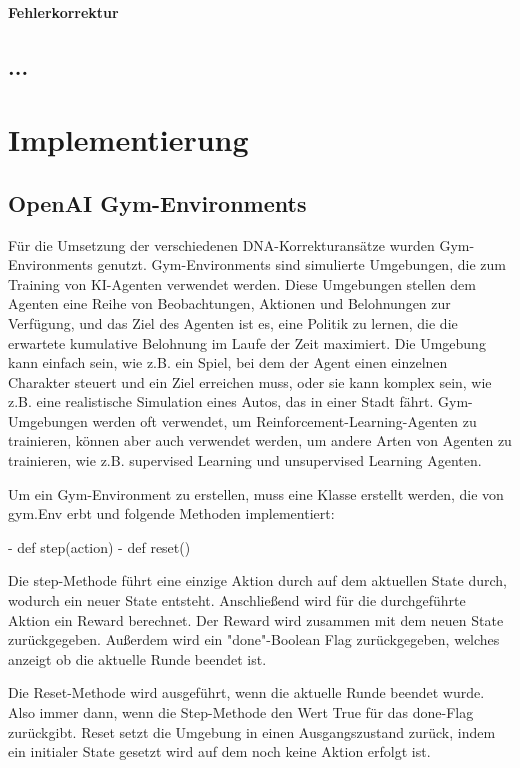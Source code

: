 \documentclass[oneside,bibliography=totocnumbered,BCOR=5mm]{scrbook}%
\theoremstyle{definition}
\theoremstyle{definition}
\theoremstyle{definition}
\theoremstyle{definition}
\theoremstyle{definition}
\theoremstyle{definition}
\begin{document}
\subsubsection{Fehlerkorrektur}
\section{...}


\clearpage


\chapter{Implementierung}

\section{OpenAI Gym-Environments}

Für die Umsetzung der verschiedenen DNA-Korrekturansätze wurden Gym-Environments genutzt.
Gym-Environments sind simulierte Umgebungen, die zum Training von KI-Agenten verwendet werden. 
Diese Umgebungen stellen dem Agenten eine Reihe von Beobachtungen, Aktionen und Belohnungen zur Verfügung, 
und das Ziel des Agenten ist es, eine Politik zu lernen, 
die die erwartete kumulative Belohnung im Laufe der Zeit maximiert. 
Die Umgebung kann einfach sein, wie z.B. ein Spiel, bei dem der Agent einen einzelnen Charakter steuert und 
ein Ziel erreichen muss, oder sie kann komplex sein, wie z.B. eine realistische Simulation eines Autos, 
das in einer Stadt fährt. 
Gym-Umgebungen werden oft verwendet, um Reinforcement-Learning-Agenten zu trainieren, 
können aber auch verwendet werden, um andere Arten von Agenten zu trainieren, 
wie z.B. supervised Learning und unsupervised Learning Agenten.

Um ein Gym-Environment zu erstellen, muss eine Klasse erstellt werden, 
die von gym.Env erbt und folgende Methoden implementiert:

- def step(action)
- def reset()

Die step-Methode führt eine einzige Aktion durch auf dem aktuellen State durch, wodurch ein neuer State entsteht.
Anschließend wird für die durchgeführte Aktion ein Reward berechnet. Der Reward wird zusammen mit dem neuen State zurückgegeben. 
Außerdem wird ein "done"-Boolean Flag zurückgegeben, welches anzeigt ob die aktuelle Runde beendet ist.

Die Reset-Methode wird ausgeführt, wenn die aktuelle Runde beendet wurde. 
Also immer dann, wenn die Step-Methode den Wert True für das done-Flag zurückgibt. 
Reset setzt die Umgebung in einen Ausgangszustand zurück, indem ein initialer State gesetzt wird auf dem noch keine Aktion erfolgt ist.
\end{document}
